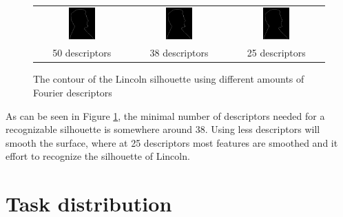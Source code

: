 \documentclass[a4paper]{article}
\begin{document}
\begin{enumerate}
\begin{figure}[H]
\begin{tabular}{ccc}
        \includegraphics[width=0.3\textwidth]{../lab5ex3/contour-50.png} & \includegraphics[width=0.3\textwidth]{../lab5ex3/contour-38.png} & \includegraphics[width=0.3\textwidth]{../lab5ex3/contour-25.png} \\
    50 descriptors &  38 descriptors & 25 descriptors \\
\end{tabular}
\caption{The contour of the Lincoln silhouette using different amounts of Fourier descriptors}
\label{fig:contour}
\end{figure}

As can be seen in Figure \ref{fig:contour}, the minimal number of descriptors needed for a recognizable silhouette is somewhere around 38. 
Using less descriptors will smooth the surface, where at 25 descriptors most features are smoothed and it effort to recognize the silhouette of Lincoln.

\end{enumerate}

\section*{Task distribution}
\end{document}
